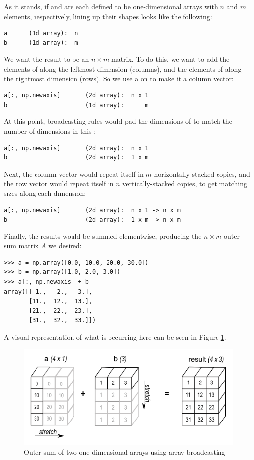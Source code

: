 \begin{itemize}
As it stands, if  and  are each defined to be one-dimensional arrays with $n$ and $m$ elements, respectively, lining up their shapes looks like the following:
\begin{lstlisting}
a	   (1d array):  n
b	   (1d array):  m
\end{lstlisting} 
We want the result to be an $n \times m$ matrix. 
To do this, we want to add the elements of  along the leftmost dimension (columns), and the elements of  along the rightmost dimension (rows). 
So we use a  on  to make it a column vector:
\begin{lstlisting}
a[:, np.newaxis]	   (2d array):  n x 1
b	                   (1d array):      m
\end{lstlisting}
At this point, broadcasting rules would pad the dimensions of  to match the number of dimensions in this :
\begin{lstlisting}
a[:, np.newaxis]	   (2d array):  n x 1
b	                   (2d array):  1 x m
\end{lstlisting}
Next, the column vector  would repeat itself in $m$ horizontally-stacked copies, and the row vector  would repeat itself in $n$ vertically-stacked copies, to get matching sizes along each dimension:
\begin{lstlisting}
a[:, np.newaxis]	   (2d array):  n x 1 -> n x m
b	                   (2d array):  1 x m -> n x m
\end{lstlisting}
Finally, the results would be summed elementwise, producing the $n \times m$ outer-sum matrix $A$ we desired:
\begin{lstlisting}
>>> a = np.array([0.0, 10.0, 20.0, 30.0])
>>> b = np.array([1.0, 2.0, 3.0])
>>> a[:, np.newaxis] + b
array([[ 1.,   2.,   3.],
       [11.,  12.,  13.],
       [21.,  22.,  23.],
       [31.,  32.,  33.]])
\end{lstlisting}

A visual representation of what is occurring here can be seen in Figure \ref{fig:broadcasting4}.
\begin{figure}[H]
    \includegraphics[width=.7\textwidth]{figures/broadcasting_outer.png}
    \caption{Outer sum of two one-dimensional arrays using array broadcasting}
    \label{fig:broadcasting4}
\end{figure}

\end{itemize}

